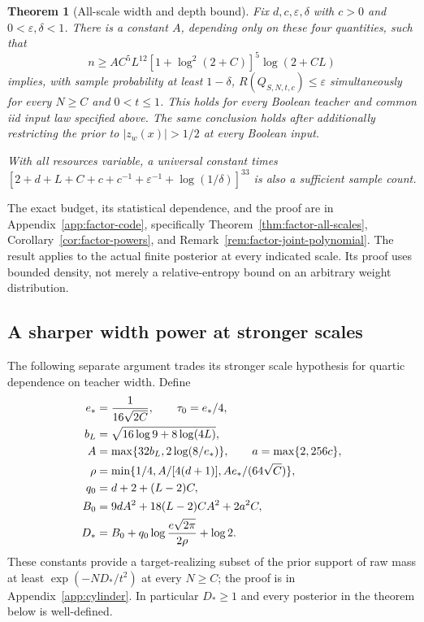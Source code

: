\documentclass[11pt]{article}
\newtheorem{theorem}{Theorem}
\begin{document}
\begin{theorem}[All-scale width and depth bound]
\label{thm:headline-all-scales}
Fix $d,c,\varepsilon,\delta$ with $c>0$ and $0<\varepsilon,\delta<1$.
There is a constant $A$, depending only on these four quantities, such that
\[
 n\ge A C^5L^{12}[1+\log^2(2+C)]^5\log(2+CL)
\]
implies, with sample probability at least $1-\delta$,
$R(Q_{S,N,t,c})\le\varepsilon$ simultaneously for every $N\ge C$ and
$0<t\le1$. This holds for every Boolean teacher and common iid input law
specified above. The same conclusion holds after additionally restricting
the prior to $|z_w(x)|>1/2$ at every Boolean input.

With all resources variable, a universal constant times
$[2+d+L+C+c+c^{-1}+\varepsilon^{-1}+\log(1/\delta)]^{33}$
is also a sufficient sample count.
\end{theorem}

The exact budget, its statistical dependence, and the proof are in
Appendix~\ref{app:factor-code}, specifically
Theorem~\ref{thm:factor-all-scales}, Corollary~\ref{cor:factor-powers}, and
Remark~\ref{rem:factor-joint-polynomial}. The result applies to the actual
finite posterior at every indicated scale. Its proof uses bounded density,
not merely a relative-entropy bound on an arbitrary weight distribution.

\subsection{A sharper width power at stronger scales}

The following separate argument trades its stronger scale hypothesis for
quartic dependence on teacher width. Define
\begin{align}
 e_*&=\frac1{16\sqrt{2C}},\qquad \tau_0=e_*/4,\notag\\
 b_L&=\sqrt{16\log9+8\log(4L)},\notag\\
 A&=\max\{32b_L,2\log(8/e_*)\},\qquad a=\max\{2,256c\},\notag\\
 \rho&=\min\{1/4,A/[4(d+1)],Ae_*/(64\sqrt C)\},\notag\\
 q_0&=d+2+(L-2)C,\notag\\
 B_0&=9dA^2+18(L-2)CA^2+2a^2C,\notag\\
 D_*&=B_0+q_0\log\frac{e\sqrt{2\pi}}{2\rho}+\log2.
 \label{eq:target-cost}
\end{align}
These constants provide a target-realizing subset of the prior support of
raw mass at least $\exp(-ND_*/t^2)$ at every $N\ge C$; the proof is in
Appendix~\ref{app:cylinder}. In particular $D_*\ge1$ and every posterior
in the theorem below is well-defined.
\end{document}
